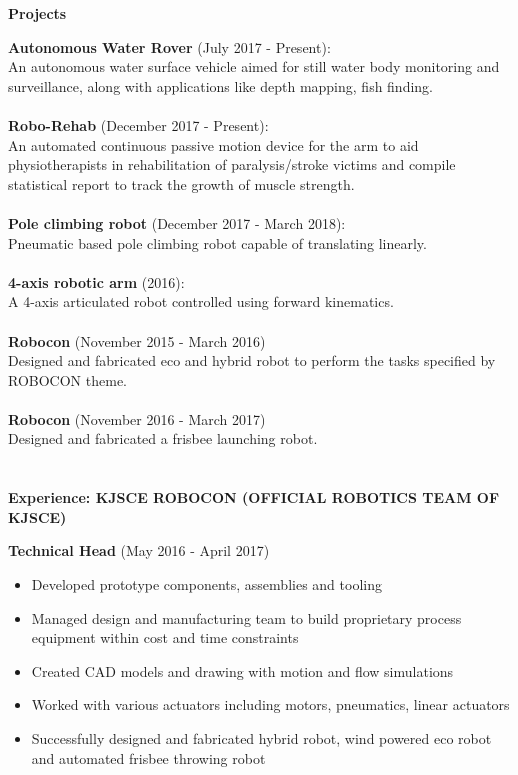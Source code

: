 \documentclass[letterpaper,11pt]{article}
\newcommand{\SmallSep}{\vspace{0.5em}}
\newcommand{\CVSection}[1]
{\Large\textbf{#1}\par
	\SmallSep\normalsize\normalfont}
\begin{document}
\CVSection{Projects}

\textbf{Autonomous Water Rover} (July 2017 - Present): \\
An autonomous water surface vehicle aimed for still water body monitoring and surveillance, along with applications like depth mapping, fish finding.  \\

\textbf{}  \\
\textbf{Robo-Rehab} (December 2017 - Present): \\
An automated continuous passive motion device for the arm to aid physiotherapists in rehabilitation of paralysis/stroke victims and compile statistical report to track the growth of muscle strength.
\textbf{}  \\
\textbf{}  \\

\textbf{Pole climbing robot} (December 2017 - March 2018): \\
Pneumatic based pole climbing robot capable of translating linearly.
\textbf{}  \\
\textbf{}  \\


\textbf{4-axis robotic arm} (2016): \\
A 4-axis articulated robot controlled using forward kinematics.
\textbf{}  \\
\textbf{}  \\


\textbf{Robocon} (November 2015 - March 2016)\\
Designed and fabricated eco and hybrid robot to perform the tasks specified by ROBOCON theme.
\textbf{}  \\
\textbf{}  \\


\textbf{Robocon} (November 2016 - March 2017)\\
Designed and fabricated a frisbee launching robot.
\textbf{}  \\
\textbf{}  \\
\textbf{}  \\

\CVSection{Experience: KJSCE ROBOCON (OFFICIAL ROBOTICS TEAM OF KJSCE)}
\textbf{Technical Head} (May 2016 - April 2017) \\


\begin{itemize}
	\item Developed prototype components, assemblies and tooling
	\item Managed design and manufacturing team to build proprietary process equipment within cost and time constraints
	\item  Created CAD models and drawing with motion and flow simulations
	\item Worked with various actuators including motors, pneumatics, linear actuators 
	\item Successfully designed and fabricated hybrid robot, wind powered eco robot and automated frisbee throwing robot
\end{itemize}
\textbf{}  \\
\end{document}
